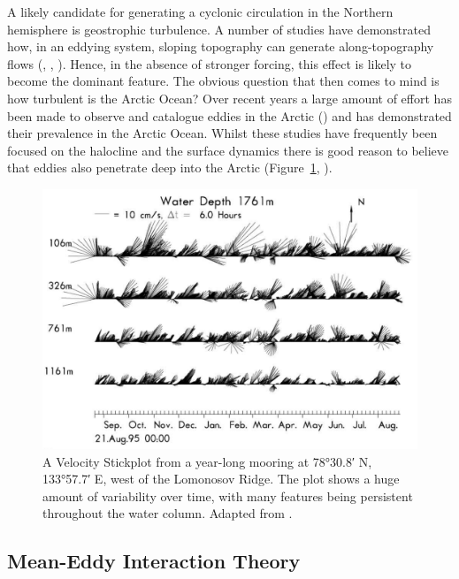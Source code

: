 \documentclass[10pt,a4paper]{article}
\begin{document}
A likely candidate for generating a cyclonic circulation in the Northern hemisphere is
geostrophic turbulence. A number of studies have demonstrated how, in an eddying system, 
sloping topography can generate along-topography flows (\cite{treguier1989topographically}, \cite{adcock2000interactions}, \cite{nost2008asymmetry}). Hence, in the absence of stronger
forcing, this effect is likely to become the dominant feature. The obvious question that then
comes to mind is how turbulent is the Arctic Ocean? Over recent years a large amount  of 
effort has been made to observe and catalogue eddies in the Arctic
(\cite{zhao2014characterizing}) and has demonstrated their prevalence in the Arctic Ocean.
Whilst these studies have frequently been focused on the halocline and the surface dynamics
there is good reason to believe that eddies also penetrate deep into the Arctic 
(Figure~\ref{fig:Woodgate2001Mooring}, \cite{woodgate2001arctic}).



\begin{figure}
	\centering
	\includegraphics[width=\linewidth]{Woodgate2001Mooring}
	\caption[Adapted from \cite{woodgate2001arctic}]{A Velocity Stickplot 
		from a year-long mooring at \ang{78;30.8;} N, \ang{133;57.7;} E, west of the Lomonosov Ridge.  The plot shows a huge amount of variability over time, with many
		features being persistent throughout the water column. Adapted from \cite{woodgate2001arctic}.}
	\label{fig:Woodgate2001Mooring}
\end{figure}

\subsection{Mean-Eddy Interaction Theory}
\end{document}
